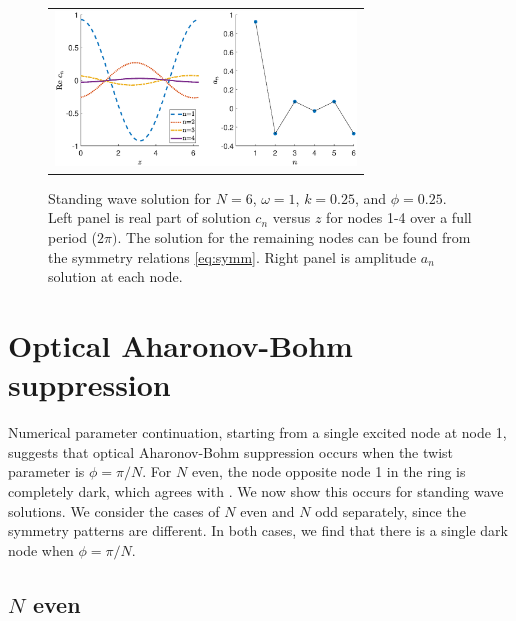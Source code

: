 \documentclass[reprint, amsmath,amssymb,aps]{revtex4-2}
\begin{document}
\begin{figure}
\begin{center}
\begin{tabular}{c}
\includegraphics[width=8cm]{images/twist025.eps}
\end{tabular}
\end{center}
\caption{Standing wave solution for $N = 6$, $\omega = 1$, $k = 0.25$, and $\phi = 0.25$. Left panel is real part of solution $c_n$ versus $z$ for nodes 1-4 over a full period ($2 \pi)$. The solution for the remaining nodes can be found from the symmetry relations \cref{eq:symm}. Right panel is amplitude $a_n$ solution at each node.}
\label{fig:twist025}
\end{figure}

\section{Optical Aharonov-Bohm suppression}\label{sec:ABsupp}

Numerical parameter continuation, starting from a single excited node at node 1, suggests that optical Aharonov-Bohm suppression occurs when the twist parameter is $\phi = \pi/N$. For $N$ even, the node opposite node 1 in the ring is completely dark, which agrees with \cite{castro2016,Parto2017}. We now show this occurs for standing wave solutions. We consider the cases of $N$ even and $N$ odd separately, since the symmetry patterns are different. In both cases, we find that there is a single dark node when $\phi = \pi/N$.

\subsection{\texorpdfstring{$N$}{N} even}\label{sec:Neven}
\end{document}
